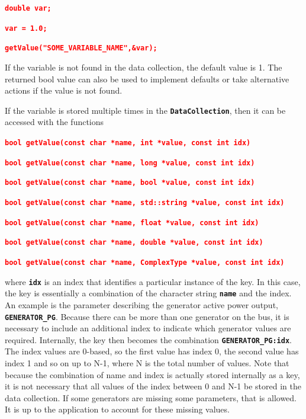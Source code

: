 \documentclass[12pt]{report} %
\begin{document}
\textcolor{red}{\texttt{\textbf{double var;}}}

\textcolor{red}{\texttt{\textbf{var = 1.0;}}}

\textcolor{red}{\texttt{\textbf{getValue("SOME\_VARIABLE\_NAME",\&var);}}}

If the variable is not found in the data collection, the default value is 1. The returned bool value can also be used to implement defaults or take alternative actions if the value is not found.

If the variable is stored multiple times in the \texttt{\textbf{DataCollection}}, then it can be accessed with the functions

\textcolor{red}{\texttt{\textbf{bool getValue(const char *name, int *value, const int idx)}}}

\textcolor{red}{\texttt{\textbf{bool getValue(const char *name, long *value, const int idx)}}}

\textcolor{red}{\texttt{\textbf{bool getValue(const char *name, bool *value, const int idx)}}}

\textcolor{red}{\texttt{\textbf{bool getValue(const char *name, std::string *value, const int idx)}}}

\textcolor{red}{\texttt{\textbf{bool getValue(const char *name, float *value, const int idx)}}}

\textcolor{red}{\texttt{\textbf{bool getValue(const char *name, double *value, const int idx)}}}

\textcolor{red}{\texttt{\textbf{bool getValue(const char *name, ComplexType *value, const int idx)}}}

where \texttt{\textbf{idx}} is an index that identifies a particular instance of the key. In this case, the key is essentially a combination of the character string \texttt{\textbf{name}} and the index. An example is the parameter describing the generator active power output, \texttt{\textbf{GENERATOR\_PG}}. Because there can be more than one generator on the bus, it is necessary to include an additional index to indicate which generator values are required. Internally, the key then becomes the combination \texttt{\textbf{GENERATOR\_PG:idx}}. The index values are 0-based, so the first value has index 0, the second value has index 1 and so on up to N-1, where N is the total number of values. Note that because the combination of name and index is actually stored internally as a key, it is not necessary that all values of the index between 0 and N-1 be stored in the data collection. If some generators are missing some parameters, that is allowed. It is up to the application to account for these missing values.
\end{document}
